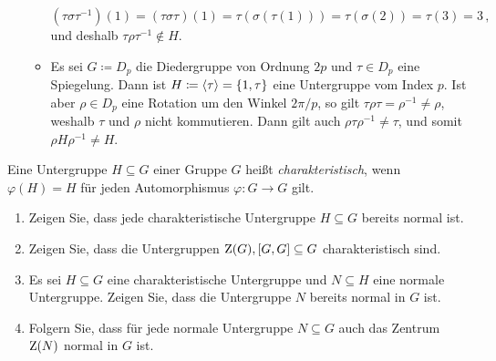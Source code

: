 \begin{solution}
\begin{enumerate}
\begin{itemize}
          \[
              (\tau \sigma \tau^{-1})(1)
            = (\tau \sigma \tau)(1)
            = \tau(\sigma(\tau(1)))
            = \tau(\sigma(2))
            = \tau(3)
            = 3 \,,
          \]
          und deshalb $\tau \rho \tau^{-1} \notin H$.
        \item
          Es sei $G \coloneqq D_p$ die Diedergruppe von Ordnung $2p$ und $\tau \in D_p$ eine Spiegelung.
          Dann ist $H \coloneqq \langle\tau\rangle = \{1, \tau\}$ eine Untergruppe vom Index $p$.
          Ist aber $\rho \in D_p$ eine Rotation um den Winkel $2\pi/p$, so gilt $\tau \rho \tau = \rho^{-1} \neq \rho$, weshalb $\tau$ und $\rho$ nicht kommutieren.
          Dann gilt auch $\rho \tau \rho^{-1} \neq \tau$, und somit $\rho H \rho^{-1} \neq H$.
      \end{itemize}
  \end{enumerate}
\end{solution}


\begin{question}[subtitle = Charakteristische Untergruppen]
  Eine Untergruppe $H \subseteq G$ einer Gruppe $G$ heißt \emph{charakteristisch}, wenn $\varphi(H) = H$ für jeden Automorphismus $\varphi \colon G \to G$ gilt.
  \begin{enumerate}
    \item
      Zeigen Sie, dass jede charakteristische Untergruppe $H \subseteq G$ bereits normal ist.
    \item
      Zeigen Sie, dass die Untergruppen $\operatorname{Z}(G), [G,G] \subseteq G$ charakteristisch sind.
    \item
      Es sei $H \subseteq G$ eine charakteristische Untergruppe und $N \subseteq H$ eine normale Untergruppe.
      Zeigen Sie, dass die Untergruppe $N$ bereits normal in $G$ ist.
    \item
      Folgern Sie, dass für jede normale Untergruppe $N \subseteq G$ auch das Zentrum $\operatorname{Z}(N)$ normal in $G$ ist.
  \end{enumerate}
\end{question}


